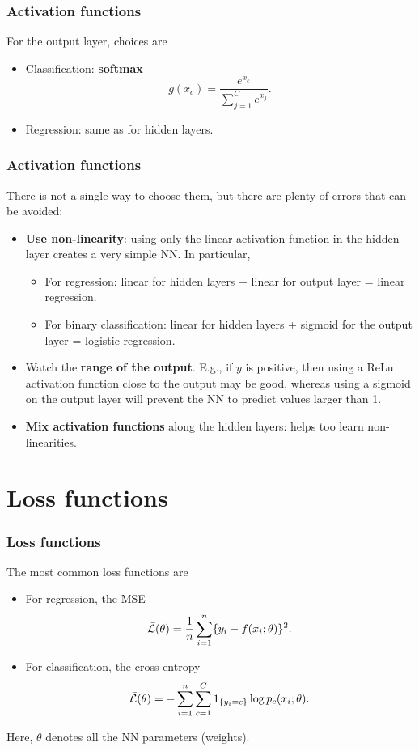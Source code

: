 \begin{frame}
\frametitle{Activation functions}
For the output layer, choices are
\begin{itemize}
\item Classification: {\bf softmax}
$$
g(x_c) = \frac{e^{x_c}}{\sum_{j=1}^C e^{x_j}}.
$$
\item Regression: same as for hidden layers.
\end{itemize}
\end{frame}
\begin{frame}
\frametitle{Activation functions}
There is not a single way to choose them, but there are plenty of errors that can be avoided:
\begin{itemize}
\item {\bf Use non-linearity}: using only the linear activation function in the hidden layer creates a very simple NN. In particular,
\begin{itemize}
\item For regression: linear for hidden layers + linear for output layer = linear regression.
\item For binary classification:  linear for hidden layers + sigmoid for the output layer = logistic regression.
\end{itemize}
\item Watch the {\bf range of the output}. E.g., if $y$ is positive, then using a ReLu activation function close to the output may be good, whereas using a sigmoid on the output layer will prevent the NN to predict values larger than 1.
\item {\bf Mix activation functions} along the hidden layers: helps too learn non-linearities.
\end{itemize}
\end{frame}
\section{Loss functions}
\begin{frame}
\frametitle{Loss functions}
The most common loss functions are
\begin{itemize}
\item For regression, the MSE
$$
\bar{\cal L}(\theta) = \frac{1}{n} \sum_{i=1}^n \{y_i - f(x_i;\theta)\}^2.
$$
\item For classification, the cross-entropy
$$
\bar{\cal L}(\theta) = -\sum_{i=1}^n \sum_{c=1}^C 1_{\{y_i=c\}} \log p_c(x_i;\theta).
$$
\end{itemize}
Here, $\theta$ denotes all the NN parameters (weights).
\end{frame}
